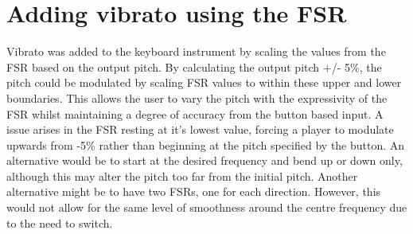 \documentclass[titlepage]{scrartcl}
\begin{document}
    \section{Adding vibrato using the FSR}
    Vibrato was added to the keyboard instrument by scaling the values from the
    FSR based on the output pitch. By calculating the output pitch +/- 5\%, the
    pitch could be modulated by scaling FSR values to within these upper and
    lower boundaries. This allows the user to vary the pitch with the
    expressivity of the FSR whilst maintaining a degree of accuracy from the
    button based input. A issue arises in the FSR resting at it's lowest value,
    forcing a player to modulate upwards from -5\% rather than beginning at the
    pitch specified by the button. An alternative would be to start at the
    desired frequency and bend up or down only, although this may alter the
    pitch too far from the initial pitch. Another alternative might be to have
    two FSRs, one for each direction. However, this would not allow for the
    same level of smoothness around the centre frequency due to the need to
    switch.

    \printbibliography
\end{document}
